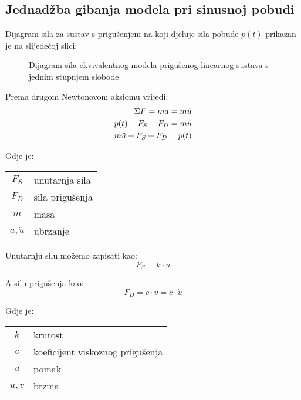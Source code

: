 \subsection{Jednadžba gibanja modela pri sinusnoj pobudi}
Dijagram sila za sustav s prigušenjem na koji djeluje sila pobude $p(t)$ prikazan je
na slijedećoj slici:

\begin{figure}[H]
    
    \label{fig:sile-priguseni-ekvivalentni-sustav-sdf}
    \caption{Dijagram sila ekvivalentnog modela prigušenog linearnog sustava s jednim stupnjem slobode}
\end{figure}

Prema drugom Newtonovom aksiomu vrijedi:
\begin{align}
    \Sigma F = ma = m\ddot{u}\notag\\
        p(t) - F_S - F_D = m\ddot{u} \notag\\
        m\ddot{u} + F_S + F_D = p(t) \label{eq:newton}
\end{align}

Gdje je:\\
\begin{table}[H]
\begin{tabular}{c l}
	$F_S$ & unutarnja sila \\
	$F_D$ & sila prigušenja \\
	$m$   & masa \\
        $a,\ddot{u}$   & ubrzanje\\
\end{tabular}
\end{table}

Unutarnju silu možemo zapisati kao:
\begin{equation}
	F_S = k \cdot u \label{eq:hooke}
\end{equation}

A silu prigušenja kao:
\begin{equation}
	F_D = c \cdot v = c \cdot \dot{u} \label{eq:prigusenje}
\end{equation}

Gdje je:\\
\begin{table}[H]
\begin{tabular}{c l}
	$k$ & krutost \\
	$c$ & koeficijent viskoznog prigušenja \\
	$u$ & pomak \\
	$\dot{u},v$ & brzina \\
\end{tabular}
\end{table}

